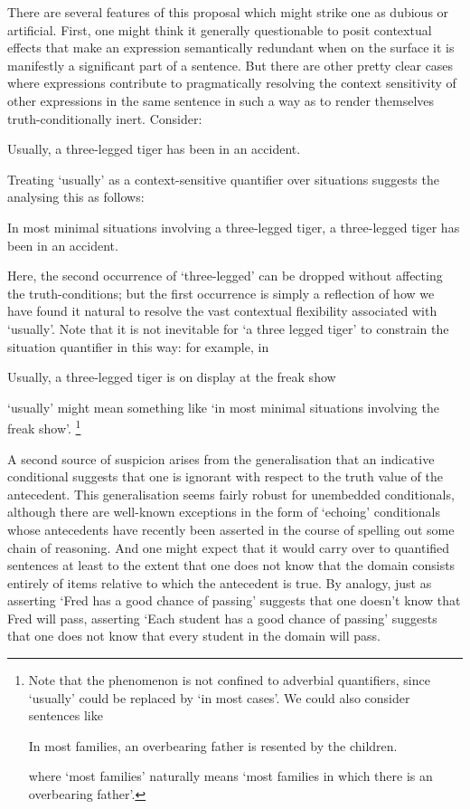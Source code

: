 \documentclass[If.tex]{subfiles}
\begin{document}
There are several features of this proposal which might strike one as dubious or artificial.  First, one might think it generally questionable to posit contextual effects that make an expression semantically redundant when on the surface it is manifestly a significant part of a sentence.  But there are other pretty clear cases where expressions contribute to pragmatically resolving the context sensitivity of other expressions in the same sentence in such a way as to render themselves truth-conditionally inert.  Consider:
\begin{prop}
	\nitem
	Usually, a three-legged tiger has been in an accident.
\end{prop}
Treating ‘usually’ as a context-sensitive quantifier over situations suggests the analysing this as follows:
\begin{prop}
	\nitem
	In most minimal situations involving a three-legged tiger, a three-legged tiger has been in an accident.
\end{prop}
Here, the second occurrence of ‘three-legged’ can be dropped without affecting the truth-conditions; but the first occurrence is simply a reflection of how we have found it natural to resolve the vast contextual flexibility associated with ‘usually’.  Note that it is not inevitable for ‘a three legged tiger’ to constrain the situation quantifier in this way: for example, in
\begin{prop}
	\nitem
	Usually, a three-legged tiger is on display at the freak show
\end{prop}
‘usually’ might mean something like ‘in most minimal situations involving the freak show’.%
\footnote{Note that the phenomenon is not confined to adverbial quantifiers, since ‘usually’ could be replaced by ‘in most cases’.  We could also consider sentences like
	\begin{prop}
		\nitem
		In most families, an overbearing father is resented by the children.
	\end{prop}
	where ‘most families’ naturally means ‘most families in which there is an overbearing father’.}

A second source of suspicion arises from the generalisation that an indicative conditional suggests that one is ignorant with respect to the truth value of the antecedent.  This generalisation seems fairly robust for unembedded conditionals, although there are well-known exceptions in the form of ‘echoing’ conditionals whose antecedents have recently been asserted in the course of spelling out some chain of reasoning.  And one might expect that it would carry over to quantified sentences at least to the extent that one does not know that the domain consists entirely of items relative to which the antecedent is true.  By analogy, just as asserting ‘Fred has a good chance of passing’ suggests that one doesn't know that Fred will pass, asserting ‘Each student has a good chance of passing’ suggests that one does not know that every student in the domain will pass.  
\end{document}
